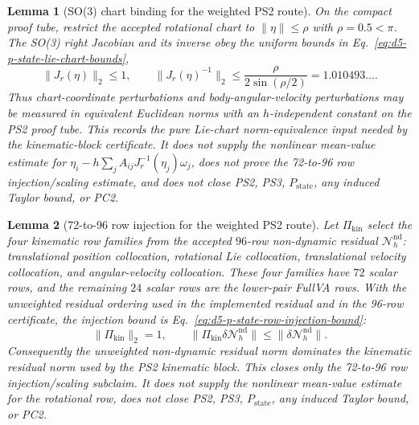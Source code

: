 \documentclass[preprint,12pt]{elsarticle}
\newtheorem{lemma}{Lemma}
\begin{document}
\begin{lemma}[SO(3) chart binding for the weighted PS2 route]
\label{lem:d5-p-state-ps2-lie-chart-binding}
On the compact proof tube, restrict the accepted rotational chart to
\(\|\eta\|\le \rho\) with \(\rho=0.5<\pi\).  The SO(3) right Jacobian and its
inverse obey the uniform bounds in
Eq.~\eqref{eq:d5-p-state-lie-chart-bounds},
\begin{equation}
\label{eq:d5-p-state-lie-chart-bounds}
\|J_r(\eta)\|_2\le 1,\qquad
\|J_r(\eta)^{-1}\|_2\le
\frac{\rho}{2\sin(\rho/2)}=1.010493\ldots .
\end{equation}
Thus chart-coordinate perturbations and body-angular-velocity perturbations
may be measured in equivalent Euclidean norms with an \(h\)-independent
constant on the PS2 proof tube.  This records the pure Lie-chart
norm-equivalence input needed by the kinematic-block certificate.  It does not
supply the nonlinear mean-value estimate for
\(\eta_i-h\sum_j A_{ij}J_r^{-1}(\eta_j)\omega_j\), does not prove the
72-to-96 row injection/scaling estimate, and does not close PS2, PS3,
\(P_{\mathrm{state}}\), any induced Taylor bound, or PC2.
\end{lemma}

\begin{lemma}[72-to-96 row injection for the weighted PS2 route]
\label{lem:d5-p-state-ps2-row-injection}
Let \(\Pi_{\mathrm{kin}}\) select the four kinematic row families from the
accepted \(96\)-row non-dynamic residual \(\mathcal N_h^{\mathrm{nd}}\):
translational position collocation, rotational Lie collocation, translational
velocity collocation, and angular-velocity collocation.  These four families
have \(72\) scalar rows, and the remaining \(24\) scalar rows are the lower-pair
FullVA rows.  With the unweighted residual ordering used in the implemented
residual and in the 96-row certificate, the injection bound is
Eq.~\eqref{eq:d5-p-state-row-injection-bound}:
\begin{equation}
\label{eq:d5-p-state-row-injection-bound}
\|\Pi_{\mathrm{kin}}\|_2=1,\qquad
\|\Pi_{\mathrm{kin}}\delta\mathcal N_h^{\mathrm{nd}}\|
\le \|\delta\mathcal N_h^{\mathrm{nd}}\| .
\end{equation}
Consequently the unweighted non-dynamic residual norm dominates the kinematic
residual norm used by the PS2 kinematic block.  This closes only the
72-to-96 row injection/scaling subclaim.  It does not supply the nonlinear
mean-value estimate for the rotational row, does not close PS2, PS3,
\(P_{\mathrm{state}}\), any induced Taylor bound, or PC2.
\end{lemma}
\end{document}
